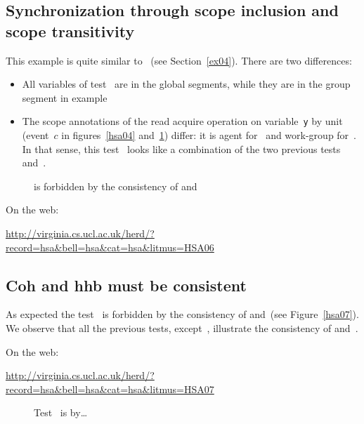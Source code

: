\documentclass[a4paper]{article}
\begin{document}
\subsection{Synchronization through scope inclusion and scope transitivity}

This example is quite similar to~ (see Section~\ref{ex04}).
There are two differences:
\begin{itemize}
\item All variables of test~ are in the global segments,
while they are in the group segment in example~
\item The
scope annotations of the read acquire operation on variable~\texttt{y} by
unit~ (event~$c$ in figures~\ref{hsa04} and~\ref{hsa06}) differ:
 it is agent for~ and work-group for~.
In that sense, this test~ looks like
a combination of the two previous tests~ and~.
\end{itemize}

\begin{figure}[htp]
\begin{center}\moveback{}
\end{center}
\caption{\label{hsa06}  is forbidden by the consistency
of \hhb{} and \coh{} \color{red}{(Forbidden)}}
\end{figure}

On the web:

\url{http://virginia.cs.ucl.ac.uk/herd/?record=hsa&bell=hsa&cat=hsa&litmus=HSA06}

\pagebreak


\subsection{Coh and hhb must be consistent}


As expected the test~ is forbidden by the consistency of \hhb{}
and~\coh (see Figure~\ref{hsa07}).  We observe that all the previous tests,
except~, illustrate the consistency of \hhb{} and~\coh{}.

On the web:

\url{http://virginia.cs.ucl.ac.uk/herd/?record=hsa&bell=hsa&cat=hsa&litmus=HSA07}

\begin{figure}[htp]
\caption{Test~ is {\color{red}{forbidden}} by\ldots}
\begin{center}

\vspace*{2cm}

\end{center}
\end{figure}
\end{document}
